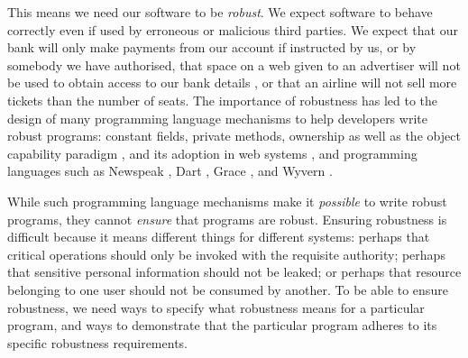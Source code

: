 \documentclass[acmsmall,screen]{acmart}
\begin{document}
This means we need our software to be \emph{robust}.
We expect software to behave correctly even if  used 
by erroneous or malicious third parties.
 We expect that our bank will only make payments 
from our account if instructed by us, or by somebody we have authorised, 
that space on a web given to an advertiser will not be used
to obtain access to our bank details \cite{cwe}, or that an
airline will not sell more tickets than the number of seats.
The importance of robustness has led to the design of many programming
language mechanisms to help developers write robust programs:
constant fields, private methods, ownership \cite{ownalias}
as well as the object capability paradigm \cite{MillerPhD},
and its adoption in  web systems
\cite{CapJavaHayesAPLAS17,CapNetSocc17Eide,DOCaT14}, and programming languages such as Newspeak
\cite{newspeak17}, Dart \cite{dart15},
Grace \cite{grace,graceClasses}, and Wyvern \cite{wyverncapabilities}.

While such programming language mechanisms make it \textit{possible} to write robust
programs, they cannot \textit{ensure} that programs are robust.
Ensuring robustness is difficult because it means 
different things for different systems: perhaps
that critical operations should only be invoked with the requisite authority;
perhaps that sensitive personal information should not be leaked; 
or perhaps that resource belonging to one user should not be consumed by another.
%
To be able to ensure robustness, we need ways to specify what robustness means for a 
particular program, and ways to demonstrate that the particular program 
adheres to its specific robustness requirements.

\end{document}
